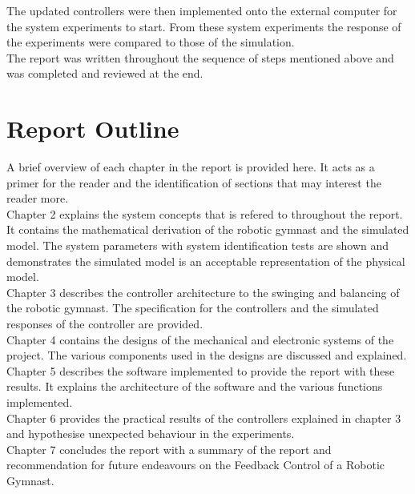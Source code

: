 The updated controllers were then implemented onto the external computer for the system experiments to start. From these system experiments the response of the experiments were compared to those of the simulation.\\

The report was written throughout the sequence of steps mentioned above and was completed and reviewed at the end.


\section{Report Outline}

A brief overview of each chapter in the report is provided here. It acts as a primer for the reader and the identification of sections that may interest the reader more.\\

Chapter 2 explains the system concepts that is refered to throughout the report. It contains the mathematical derivation of the robotic gymnast and the simulated model. The system parameters with system identification tests are shown and demonstrates the simulated model is an acceptable representation of the physical model.\\

Chapter 3 describes the controller architecture to the swinging and balancing of the robotic gymnast. The specification for the controllers and the simulated responses of the controller are provided.\\

Chapter 4 contains the designs of the mechanical and electronic systems of the project. The various components used in the designs are discussed and explained.\\

Chapter 5 describes the software implemented to provide the report with these results. It explains the architecture of the software and the various functions implemented.\\

Chapter 6 provides the practical results of the controllers explained in chapter 3 and hypothesise unexpected behaviour in the experiments.\\

Chapter 7 concludes the report with a summary of the report and recommendation for future endeavours on the Feedback Control of a Robotic Gymnast. 

 
